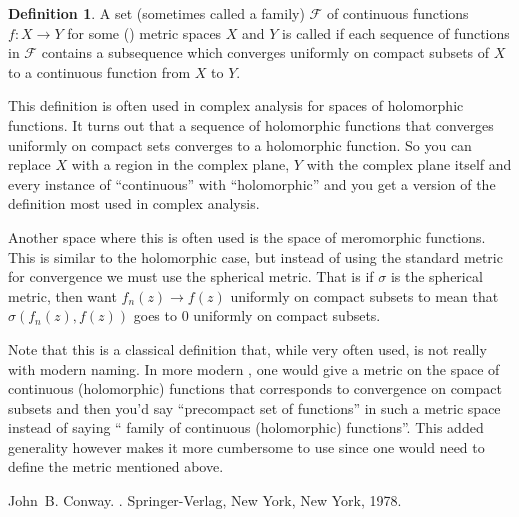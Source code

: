 \documentclass[12pt]{article}
\theoremstyle{theorem}
\theoremstyle{definition}
\newtheorem*{defn}{Definition}
\begin{document}
\begin{defn}
A set (sometimes called a family) ${\mathcal{F}}$
of continuous functions $f \colon X \to Y$ for some ()
metric spaces $X$ and $Y$
is called {\em {}} if each sequence of functions in ${\mathcal{F}}$
contains a subsequence which converges uniformly on compact subsets of $X$ to a 
continuous function from $X$ to $Y$.
\end{defn}

This definition is often used in complex analysis for spaces of holomorphic functions.  It turns out that a sequence of holomorphic functions that converges uniformly on compact sets converges to a holomorphic function.  So you can replace
$X$ with a region in the complex plane, $Y$ with the complex plane itself
and every instance of ``continuous'' with ``holomorphic'' and you get a version of the definition most used in complex analysis.

Another space where this is often used is the space of meromorphic functions.
This is similar to the holomorphic case, but instead of using the standard
metric for convergence we must use the spherical metric.  That is if $\sigma$
is the spherical metric, then want $f_n(z) \to f(z)$ uniformly on compact
subsets to mean that $\sigma(f_n(z),f(z))$ goes to 0 uniformly on compact
subsets.

Note that this is a classical definition that, while very often used, is not really 
with modern naming.  In more modern ,
one would give a metric
on the space of continuous (holomorphic) functions that corresponds to 
convergence on compact subsets and then you'd say ``precompact set of functions'' in such a metric space instead of saying `` family of continuous (holomorphic) functions''.  This added generality however
makes it more cumbersome to use since one would need to define the metric mentioned above.

\begin{thebibliography}{9}
John~B. Conway.
{\em {}}.
Springer-Verlag, New York, New York, 1978.
\end{thebibliography}
\end{document}

